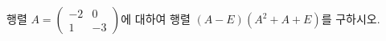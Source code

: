 \hspace*{2mm}\begin{minipage}[t]{\dimexpr\linewidth-2mm\relax}\vspace{0pt}
행렬 $A=\begin{pmatrix} -2 & 0 \\ 1 & -3 \end{pmatrix}$에 대하여 행렬 $(A-E)(A^2+A+E)$를 구하시오.\end{minipage}
